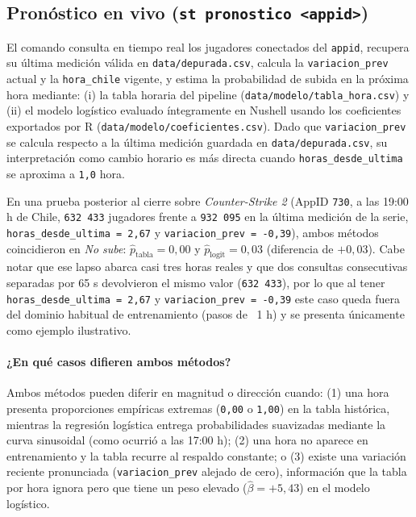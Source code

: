 \documentclass[11pt,a4paper]{article}
\begin{document}
\subsection{Pronóstico en vivo (\texttt{st pronostico <appid>})}

El comando consulta en tiempo real los jugadores conectados del \texttt{appid}, recupera su última medición válida en \texttt{data/depurada.csv}, calcula la \texttt{variacion\_prev} actual y la \texttt{hora\_chile} vigente, y estima la probabilidad de subida en la próxima hora mediante: (i) la tabla horaria del pipeline (\texttt{data/modelo/tabla\_hora.csv}) y (ii) el modelo logístico evaluado íntegramente en Nushell usando los coeficientes exportados por R (\texttt{data/modelo/coeficientes.csv}). Dado que \texttt{variacion\_prev} se calcula respecto a la última medición guardada en \texttt{data/depurada.csv}, su interpretación como cambio horario es más directa cuando \texttt{horas\_desde\_ultima} se aproxima a \texttt{1,0} hora.

En una prueba posterior al cierre sobre \emph{Counter-Strike 2} (AppID \texttt{730}, a las 19:00 h de Chile, \texttt{632\,433} jugadores frente a \texttt{932\,095} en la última medición de la serie, \texttt{horas\_desde\_ultima = 2,67} y \texttt{variacion\_prev = -0,39}), ambos métodos coincidieron en \emph{No sube}: $\hat{p}_{\text{tabla}} = 0{,}00$ y $\hat{p}_{\text{logit}} = 0{,}03$ (diferencia de $+0{,}03$). Cabe notar que ese lapso abarca casi tres horas reales y que dos consultas consecutivas separadas por 65 s devolvieron el mismo valor (\texttt{632\,433}), por lo que al tener \texttt{horas\_desde\_ultima = 2,67} y \texttt{variacion\_prev = -0,39} este caso queda fuera del dominio habitual de entrenamiento (pasos de ~1 h) y se presenta únicamente como ejemplo ilustrativo.

\paragraph{¿En qué casos difieren ambos métodos?}
Ambos métodos pueden diferir en magnitud o dirección cuando: (1) una hora presenta proporciones empíricas extremas (\texttt{0,00} o \texttt{1,00}) en la tabla histórica, mientras la regresión logística entrega probabilidades suavizadas mediante la curva sinusoidal (como ocurrió a las 17:00 h); (2) una hora no aparece en entrenamiento y la tabla recurre al respaldo constante; o (3) existe una variación reciente pronunciada (\texttt{variacion\_prev} alejado de cero), información que la tabla por hora ignora pero que tiene un peso elevado ($\hat{\beta} = +5{,}43$) en el modelo logístico.
\end{document}
